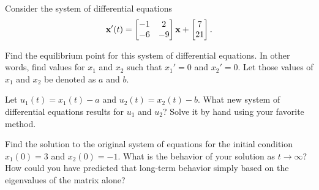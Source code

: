 \documentclass[boxes]{gsypset}
\begin{document}
\begin{problem}
	Consider the system of differential equations
	\[
		\mathbf{x}'(t) = \begin{bmatrix}-1 & 2 \\ -6 & -9\end{bmatrix} \mathbf{x} + \begin{bmatrix}7 \\ 21\end{bmatrix}.
	\]
	\begin{subproblems}
		\subproblem
			Find the equilibrium point for this system of differential equations. 
			In other words, find values for $x_1$ and $x_2$ such that $x_1'=0$ and $x_2'=0$. 
			Let those values of $x_1$ and $x_2$ be denoted as $a$ and $b$.
			\begin{solution}
				
			\end{solution}
		\subproblem 
			Let $u_1(t)=x_1(t)-a$ and $u_2(t)=x_2(t)-b$. 
			What new system of differential equations results for $u_1$ and $u_2$? 
			Solve it by hand using your favorite method.
			\begin{solution}
				
			\end{solution}
		\subproblem 
			Find the solution to the original system of equations 
			for the initial condition $x_1(0)=3$ and $x_2(0)=-1$. 
			What is the behavior of your solution as $t\to\infty$? 
			How could you have predicted that long-term behavior 
			simply based on the eigenvalues of the matrix alone?
			\begin{solution}
				
			\end{solution}
	\end{subproblems}
\end{problem}
\end{document}
